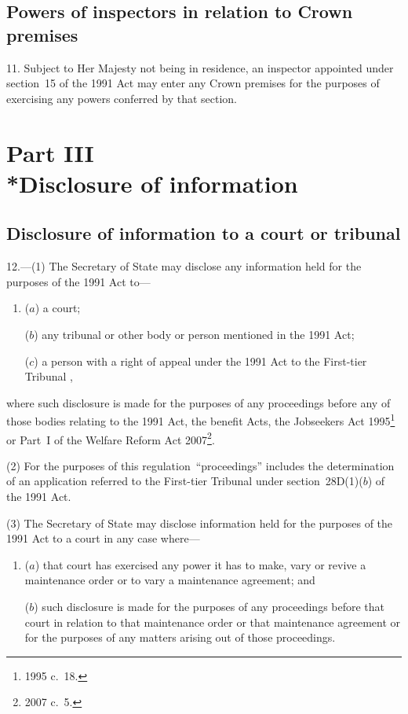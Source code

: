 \documentclass[12pt,a4paper]{article}
\begin{document}
\subsection[11. Powers of inspectors in relation to Crown premises]{Powers of inspectors in relation to Crown premises}

11.  Subject to Her Majesty not being in residence, an inspector appointed under section~15 of the 1991 Act may enter any Crown premises for the purposes of exercising any powers conferred by that section.

\section[Part III --- Disclosure of information]{Part III\\*Disclosure of information}

\renewcommand\parthead{--- Part~III}

\subsection[12. Disclosure of information to a court or tribunal]{Disclosure of information to a court or tribunal}

12.---(1)  The 
Secretary of State  %
may disclose any information held for the purposes of the 1991 Act to—
\begin{enumerate}\item[]
($a$) a court;

($b$) any tribunal or other body or person mentioned in the 1991 Act;

($c$) a person with a right of appeal under the 1991 Act to 
the First-tier Tribunal%
,
\end{enumerate}
where such disclosure is made for the purposes of any proceedings before any of those bodies relating to the 1991 Act, the benefit Acts, the Jobseekers Act 1995\footnote{1995 c.~18.} or Part~I of the Welfare Reform Act 2007\footnote{2007 c.~5.}.

(2) For the purposes of this regulation~“proceedings” includes the determination of an application referred to 
the First-tier Tribunal  %
under section~28D(1)($b$)  of the 1991 Act.

(3) The 
Secretary of State  %
may disclose information held for the purposes of the 1991 Act to a court in any case where—
\begin{enumerate}\item[]
($a$) that court has exercised any power it has to make, vary or revive a maintenance order or to vary a maintenance agreement; and

($b$) such disclosure is made for the purposes of any proceedings before that court in relation to that maintenance order or that maintenance agreement or for the purposes of any matters arising out of those proceedings.
\end{enumerate}
\end{document}
